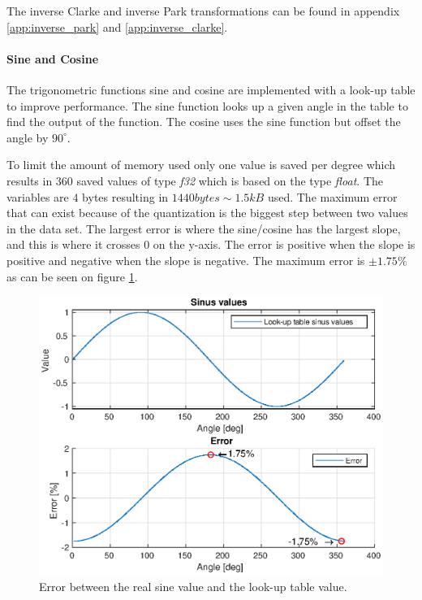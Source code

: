 The inverse Clarke and inverse Park transformations can be found in appendix \ref{app:inverse_park} and \ref{app:inverse_clarke}.


\paragraph{Sine and Cosine}
\label{sec:sine_cosine}
The trigonometric functions sine and cosine are implemented with a look-up table to improve performance. The sine function looks up a given angle in the table to find the output of the function. The cosine uses the sine function but offset the angle by $90 ^{\circ}$. 

To limit the amount of memory used only one value is saved per degree which results in $360$ saved values of type \textit{f32} which is based on the type \textit{float}. The variables are $4$ bytes resulting in $1440 bytes \sim 1.5kB$ used.
The maximum error that can exist because of the quantization is the biggest step between two values in the data set. 
The largest error is where the sine/cosine has the largest slope, and this is where it crosses 0 on the y-axis. The error is positive when the slope is positive and negative when the slope is negative. The maximum error is $\pm 1.75 \%$ as can be seen on figure \ref{fig:sinus_lookup_error}. 
\begin{figure}[H]
	\centering
	\includegraphics[width=1 \textwidth]{pictures/software/sinus_lookup_error.eps}
	\caption{Error between the real sine value and the look-up table value.}
	\label{fig:sinus_lookup_error}
\end{figure}

